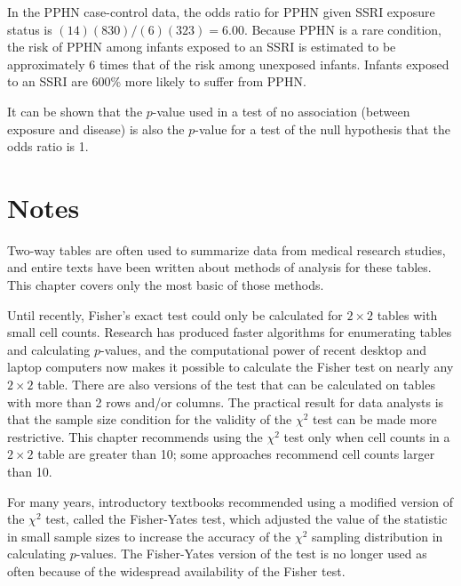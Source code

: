 In the PPHN case-control data, the odds ratio for PPHN given SSRI exposure status is $(14)(830)/(6)(323) = 6.00$.  Because PPHN is a rare condition, the risk of PPHN among infants exposed to an SSRI is estimated to be approximately 6 times that of the risk among unexposed infants.  Infants exposed to an SSRI are 600\% more likely to suffer from PPHN.  

It can be shown that the $p$-value used in a test of no association (between exposure and disease) is also the $p$-value for a test of the null hypothesis that the odds ratio is 1.


\section{Notes}

Two-way tables are often used to summarize data from medical research studies, and entire texts have been written about methods of analysis for these tables.  This chapter covers only the most basic of those methods. 

Until recently, Fisher's exact test could only be calculated for $2 \times 2$ tables with small cell counts. Research has produced faster algorithms for enumerating tables and calculating $p$-values, and the computational power of recent desktop and laptop computers now makes it possible to calculate the Fisher test on nearly any $2 \times 2$ table.  There are also versions of the test that can be calculated on tables with more than 2 rows and/or columns.  The practical result for data analysts is that the sample size condition for the validity of the $\chi^2$ test can be made more restrictive.  This chapter recommends using the $\chi^2$ test only when cell counts in a $2 \times 2$ table are greater than 10; some approaches recommend cell counts larger than 10.

For many years, introductory textbooks recommended using a modified version of the $\chi^2$ test, called the Fisher-Yates test, which adjusted the value of the statistic in small sample sizes to increase the accuracy of the $\chi^2$ sampling distribution in calculating $p$-values.  The Fisher-Yates version of the test is no longer used as often because of the widespread availability of the Fisher test.

